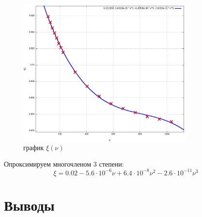 \documentclass{article}
\begin{document}
\begin{figure}[H]
    \centering
    \includegraphics[width=0.8\textwidth]{2.png}
    \caption{график \( \xi(\nu) \)}
\end{figure}

Опроксимируем многочленом 3 степени:
\[ \xi = 0.02 - 5.6\cdot 10^{-6}\nu + 6.4\cdot 10^{-8}\nu^2 - 2.6\cdot 10^{-11}\nu^3 \]




\section{Выводы}
\end{document}
